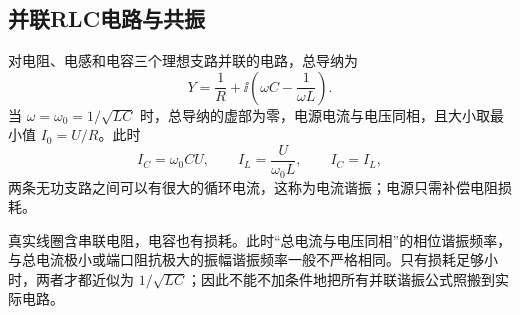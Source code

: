 \subsection{并联RLC电路与共振}


对电阻、电感和电容三个理想支路并联的电路，总导纳为
\begin{equation}
 Y=\frac1R+\ii\left(\omega C-\frac1{\omega L}\right).
\end{equation}
当 $\omega=\omega_0=1/\sqrt{LC}$ 时，总导纳的虚部为零，电源电流与电压同相，且大小取最小值 $I_0=U/R$。此时
\begin{equation}
 I_C=\omega_0CU,
 \qquad I_L=\frac{U}{\omega_0L},
 \qquad I_C=I_L,
\end{equation}
两条无功支路之间可以有很大的循环电流，这称为电流谐振；电源只需补偿电阻损耗。

真实线圈含串联电阻，电容也有损耗。此时“总电流与电压同相”的相位谐振频率，与总电流极小或端口阻抗极大的振幅谐振频率一般不严格相同。只有损耗足够小时，两者才都近似为 $1/\sqrt{LC}$；因此不能不加条件地把所有并联谐振公式照搬到实际电路。

